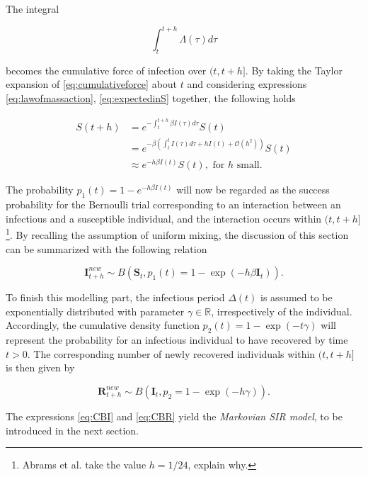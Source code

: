 \documentclass[a4paper,preprint]{elsarticle}
\renewcommand{\vec}[1]{\boldsymbol{#1}}
\begin{document}
The integral 

\begin{equation}
\label{eq:cumulativeforce}
  \int_{t}^{t+h} \Lambda(\tau)d\tau  
\end{equation}


becomes the cumulative force of infection over $(t,t+h]$. By taking the Taylor expansion of \eqref{eq:cumulativeforce} about $t$ and considering expressions \eqref{eq:lawofmassaction}, \eqref{eq:expectedinS} together, the following holds

\begin{align} 
\label{eq:expectedinS}
        S(t+h)&=e^{-\int_{t}^{t+h} \beta I(\tau)d\tau}S(t)\\
        &=e^{-\beta(\int_{t}^{t}I(\tau)d\tau+hI(t)+\mathcal{O}( h^2))}S(t)\\
        &\approx e^{-h\beta I(t)}S(t),\text{ for $h$ small.}   
\end{align}

The probability $p_1(t)=1-e^{-h\beta I(t)}$ will now be regarded as the success probability  for the Bernoulli trial corresponding to an interaction between an infectious and a susceptible individual, and the interaction occurs within $(t,t+h]$\footnote{Abrams et al. \cite{abrams21} take the value $h=1/24$, explain why.}. By recalling the assumption of uniform mixing, the discussion of this section can be summarized with the following relation

\begin{equation}
\label{eq:CBI}
\vec{I}_{t+h}^{new}\sim B(\vec{S}_t, p_1(t)=1-\exp(-h\beta \vec{I}_t)).
\end{equation}

To finish this modelling part, the infectious period $\Delta(t)$ is assumed to be exponentially distributed with parameter $\gamma \in \mathbb{R}$, irrespectively of the individual. Accordingly, the cumulative density function $p_2(t)=1-\exp(-t\gamma)$ will represent the probability for an infectious individual to have recovered by time $t>0$. The corresponding number of newly recovered individuals within $(t,t+h]$ is then given by

\begin{equation} 
    \label{eq:CBR}
    \vec{R}_{t+h}^{new}\sim B(\vec{I}_t, p_2=1-\exp(-h\gamma)).
\end{equation}

The expressions \eqref{eq:CBI} and \eqref{eq:CBR} yield the \textit{Markovian SIR model}, to be introduced in the next section.
\end{document}
